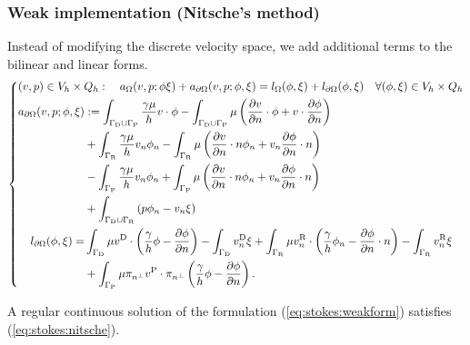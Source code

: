 \subsubsection{Weak implementation (Nitsche's method)}
%
%
Instead of modifying the discrete velocity space, we add additional terms to the bilinear and linear forms.
%
\begin{equation}\label{eq:stokes:nitsche}
%
\left\{
\begin{aligned}
&(v,p)\in V_h\times Q_h:\quad a_{\Omega}(v,p; \phi\xi) + a_{\partial\Omega}(v,p; \phi,\xi) = l_{\Omega}(\phi,\xi)+l_{\partial\Omega}(\phi,\xi) \quad\forall (\phi,\xi)\in V_h\times Q_h\\
&\begin{aligned}
 a_{\partial\Omega}(v,p; \phi,\xi) &:= \int_{\GammaD\cup\GammaP}\frac{\gamma\mu}{h}v\cdot\phi - 
 \int_{\GammaD\cup\GammaP}\mu \left(  \dn{v}\cdot  \phi + v  \cdot \dn{\phi}\right)\\
 &+\int_{\GammaR}\frac{\gamma\mu}{h}v_n\phi_n - \int_{\GammaR} \mu\left( \dn{v}\cdot n \phi_n + v_n\dn{\phi}\cdot n \right)\\
 &-\int_{\GammaP}\frac{\gamma\mu}{h}v_n\phi_n + \int_{\GammaP} \mu\left( \dn{v}\cdot n \phi_n + v_n\dn{\phi}\cdot n \right)\\
&+ \int_{\GammaD\cup\GammaR} \left( p\phi_n - v_n\xi\right)
 \\
 l_{\partial\Omega}(\phi,\xi) =& \int_{\GammaD}\mu\vD\cdot\left( \frac{\gamma}{h}\phi - \dn{\phi}\right)- \int_{\GammaD}\vD_n\xi
+ \int_{\GammaR}\mu\vRn\cdot\left( \frac{\gamma}{h}\phi_n - \dn{\phi}\cdot n\right)- \int_{\GammaR}\vRn\xi\\
&+ \int_{\GammaP}\mu\pitang\vP\cdot\pitang\left( \frac{\gamma}{h}\phi - \dn{\phi}\right).
\end{aligned}
\end{aligned}
\right.
%
\end{equation}
%
%
\begin{lemma}\label{lemma:}
A regular continuous solution of the formulation (\ref{eq:stokes:weakform}) satisfies (\ref{eq:stokes:nitsche}).
\end{lemma}
%
